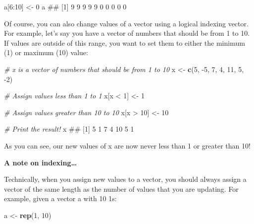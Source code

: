\documentclass[]{book}
\newenvironment{Shaded}{\begin{snugshade}}{\end{snugshade}}
\newcommand{\KeywordTok}[1]{\textcolor[rgb]{0.13,0.29,0.53}{\textbf{{#1}}}}
\newcommand{\DecValTok}[1]{\textcolor[rgb]{0.00,0.00,0.81}{{#1}}}
\newcommand{\StringTok}[1]{\textcolor[rgb]{0.31,0.60,0.02}{{#1}}}
\newcommand{\CommentTok}[1]{\textcolor[rgb]{0.56,0.35,0.01}{\textit{{#1}}}}
\newcommand{\NormalTok}[1]{{#1}}
\theoremstyle{definition}
\theoremstyle{definition}
\theoremstyle{remark}
\begin{document}
\begin{Shaded}
\begin{Highlighting}[]
\NormalTok{a[}\DecValTok{6}\NormalTok{:}\DecValTok{10}\NormalTok{] <-}\StringTok{ }\DecValTok{0}
\NormalTok{a}
\NormalTok{##  [1] 9 9 9 9 9 0 0 0 0 0}
\end{Highlighting}
\end{Shaded}

Of course, you can also change values of a vector using a logical
indexing vector. For example, let's say you have a vector of numbers
that should be from 1 to 10. If values are outside of this range, you
want to set them to either the minimum (1) or maximum (10) value:

\begin{Shaded}
\begin{Highlighting}[]
\CommentTok{# x is a vector of numbers that should be from 1 to 10}
\NormalTok{x <-}\StringTok{ }\KeywordTok{c}\NormalTok{(}\DecValTok{5}\NormalTok{, -}\DecValTok{5}\NormalTok{, }\DecValTok{7}\NormalTok{, }\DecValTok{4}\NormalTok{, }\DecValTok{11}\NormalTok{, }\DecValTok{5}\NormalTok{, -}\DecValTok{2}\NormalTok{)}

\CommentTok{# Assign values less than 1 to 1}
\NormalTok{x[x <}\StringTok{ }\DecValTok{1}\NormalTok{] <-}\StringTok{ }\DecValTok{1}

\CommentTok{# Assign values greater than 10 to 10}
\NormalTok{x[x >}\StringTok{ }\DecValTok{10}\NormalTok{] <-}\StringTok{ }\DecValTok{10}

\CommentTok{# Print the result!}
\NormalTok{x}
\NormalTok{## [1]  5  1  7  4 10  5  1}
\end{Highlighting}
\end{Shaded}

As you can see, our new values of x are now never less than 1 or greater
than 10!

\textbf{A note on indexing\ldots{}}

Technically, when you assign new values to a vector, you should always
assign a vector of the same length as the number of values that you are
updating. For example, given a vector a with 10 1s:

\begin{Shaded}
\begin{Highlighting}[]
\NormalTok{a <-}\StringTok{ }\KeywordTok{rep}\NormalTok{(}\DecValTok{1}\NormalTok{, }\DecValTok{10}\NormalTok{)}
\end{Highlighting}
\end{Shaded}
\end{document}
